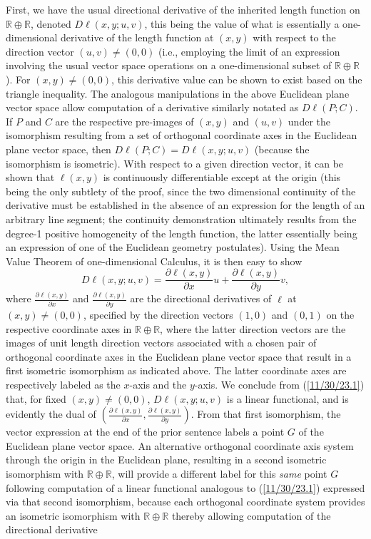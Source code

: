 \documentclass{amsart}
\numberwithin{equation}{section}
\theoremstyle{definition}
\numberwithin{theorem}{section}
\begin{document}
 First,  we have the usual directional derivative of the inherited length function on $\mathbb{R}\oplus\mathbb{R}$, denoted $D\ell(x,y;u,v)$, this being the value of what is essentially a one-dimensional derivative of the length function at $(x,y)$ with respect to the direction vector $(u,v)\ne (0,0)$ (i.e., employing the limit of an expression involving the usual vector space operations on a one-dimensional subset of $\mathbb{R}\oplus\mathbb{R}$).  For $(x,y)\ne (0,0)$, this derivative value can be shown to exist based on the triangle inequality. The analogous manipulations in the above Euclidean plane vector space allow computation of a derivative similarly notated as $D\ell(P;C)$.  If $P$ and $C$ are the respective pre-images of $(x,y)$ and $(u,v)$ under the isomorphism resulting from a set of orthogonal coordinate axes in the Euclidean plane vector space, then $D\ell(P;C) = D\ell(x,y;u,v)$ (because the isomorphism is isometric).  With respect to a given direction vector, it can be shown that $\ell(x,y)$ is continuously differentiable except at the origin (this being the only subtlety of the proof, since the two dimensional continuity of the derivative must be established in the absence of an expression for the length of an arbitrary line segment; the continuity demonstration ultimately results from the degree-1 positive homogeneity of the length function, the latter essentially being an expression of one of the Euclidean geometry postulates).  Using the Mean Value Theorem of one-dimensional Calculus, it is then easy to show \begin{equation}\label{11/30/23.1} D\ell(x,y;u,v) = \frac{\partial \ell(x,y)}{\partial x}u + \frac{\partial \ell(x,y)}{\partial y}v,\end{equation} where $\frac{\partial \ell(x,y)}{\partial x}$ and $\frac{\partial \ell(x,y)}{\partial y}$ are the directional derivatives of $\ell$ at $(x,y)\ne(0,0)$, specified by the direction vectors $(1,0)$ and $(0,1)$ on the respective coordinate axes in $\mathbb{R}\oplus\mathbb{R}$, where the latter direction vectors are the images of unit length direction vectors associated with a chosen pair of orthogonal coordinate axes in the Euclidean plane vector space that result in a first isometric isomorphism as indicated above.  The latter coordinate axes are respectively labeled as the $x$-axis and the $y$-axis. We conclude from (\ref{11/30/23.1}) that, for fixed $(x,y)\ne (0,0)$,  $D\ell(x,y;u,v)$ is a linear functional, and is evidently the dual of $\left(\frac{\partial\ell(x,y)}{\partial x}, \frac{\partial\ell(x,y)}{\partial y}\right)$.  From that first isomorphism, the vector expression at the end of the prior sentence labels a point $G$ of the Euclidean plane vector space.  An alternative orthogonal coordinate axis system through the origin in the Euclidean plane, resulting in a second isometric isomorphism with $\mathbb{R}\oplus\mathbb{R}$, will provide a different label for this {\it same} point $G$ following computation of a linear functional analogous to (\ref{11/30/23.1}) expressed via that second isomorphism, because each orthogonal coordinate system provides an isometric isomorphism with $\mathbb{R}\oplus\mathbb{R}$ thereby allowing computation of the directional derivative 
\end{document}
